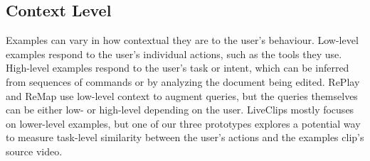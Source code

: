 \subsection{Context Level}
Examples can vary in how contextual they are to the user's behaviour. Low-level examples respond to the user's individual actions, such as the tools they use. High-level examples respond to the user's task or intent, which can be inferred from sequences of commands or by analyzing the document being edited. RePlay and ReMap use low-level context to augment queries, but the queries themselves can be either low- or high-level depending on the user. LiveClips mostly focuses on lower-level examples, but one of our three prototypes explores a potential way to measure task-level similarity between the user's actions and the examples clip's source video.